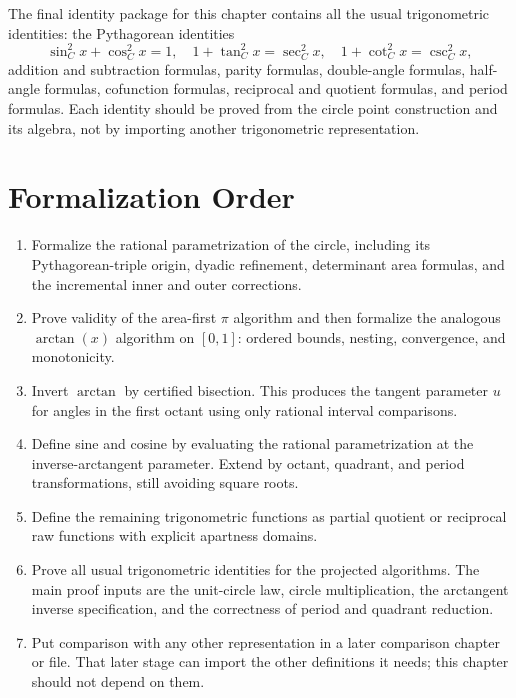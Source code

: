 \begin{theorem}
\label{thm:geometric-trig-identities}
The final identity package for this chapter contains all the usual
trigonometric identities: the Pythagorean identities
\[
  \sin_C^2 x+\cos_C^2 x=1,\quad
  1+\tan_C^2 x=\sec_C^2 x,\quad
  1+\cot_C^2 x=\csc_C^2 x,
\]
addition and subtraction formulas, parity formulas, double-angle formulas,
half-angle formulas, cofunction formulas, reciprocal and quotient formulas,
and period formulas.  Each identity should be proved from the circle point
construction and its algebra, not by importing another trigonometric
representation.
\end{theorem}

\section{Formalization Order}

\begin{enumerate}
  \item Formalize the rational parametrization of the circle, including its
  Pythagorean-triple origin, dyadic refinement, determinant area formulas, and
  the incremental inner and outer corrections.

  \item Prove validity of the area-first \(\pi\) algorithm and then formalize
  the analogous \(\arctan(x)\) algorithm on \([0,1]\): ordered bounds,
  nesting, convergence, and monotonicity.

  \item Invert \(\arctan\) by certified bisection.  This produces the tangent
  parameter \(u\) for angles in the first octant using only rational interval
  comparisons.

  \item Define sine and cosine by evaluating the rational parametrization at
  the inverse-arctangent parameter.  Extend by octant, quadrant, and period
  transformations, still avoiding square roots.

  \item Define the remaining trigonometric functions as partial quotient or
  reciprocal raw functions with explicit apartness domains.

  \item Prove all usual trigonometric identities for the projected algorithms.
  The main proof inputs are the unit-circle law, circle multiplication, the
  arctangent inverse specification, and the correctness of period and quadrant
  reduction.

  \item Put comparison with any other representation in a later comparison
  chapter or file.  That later stage can import the other definitions it
  needs; this chapter should not depend on them.
\end{enumerate}

